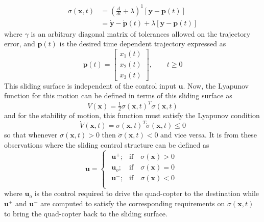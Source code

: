 \documentclass[twocolumn,10pt]{asme2e}
\begin{document}
{\begin{align}\sigma(\textbf{x},t)&=\left(\frac{d}{dt}+\lambda\right)^1\left[\textbf{y}-\textbf{p}(t)\right]\\
&=\dot{\textbf{y}}-\dot{\textbf{p}}(t)+\lambda\left[\textbf{y}-\textbf{p}(t)\right]\label{eq37}\end{align} 
where $\gamma$ is an arbitrary diagonal matrix  of tolerances allowed on the trajectory error, and $\textbf{p}(t)$ is the desired time dependent trajectory expressed as
\begin{equation}\textbf{p}(t)=\left[\begin{array}{c}
	x_1(t)\\
	x_2(t)\\
	x_3(t)
\end{array}\right],\qquad t\ge0\end{equation}
This sliding surface is independent of the control input $\textbf{u}.$
Now, the Lyapunov function for this motion can be defined in terms of this sliding surface as
\begin{equation}V(\textbf{x})=\tfrac{1}{2}\sigma(\textbf{x},t)^T\sigma(\textbf{x},t)\end{equation}
and for the stability of motion, this function must satisfy the Lyapunov condition
\begin{equation}\dot{V}(\textbf{x},t)=\sigma(\textbf{x},t)^T\dot\sigma(\textbf{x},t)\le0\end{equation}
so that whenever $\sigma(\textbf{x},t)>0$ then $\dot\sigma(\textbf{x},t)<0$ and vice versa. It is from these observations where the sliding control structure can be defined as
\begin{equation}
	\textbf{u}=\begin{cases}
		\begin{array}{lr}
			\textbf{u}^{+}; &  \text{if}\quad \sigma(\textbf{x})>0\\  
			\textbf{u}_o; &  \text{if}\quad \sigma(\textbf{x})=0\\  
			\textbf{u}^{-}; &  \text{if}\quad \sigma(\textbf{x})<0\\
		\end{array}
	\end{cases}\label{eq44}
\end{equation}
where $\textbf{u}_o$ is the control required to drive the quad-copter to the destination while $\textbf{u}^{+}$ and $\textbf{u}^{-}$ are computed to satisfy the corresponding requirements on $\dot\sigma(\textbf{x},t)$ to bring the quad-copter back to the sliding surface.


}
\end{document}
